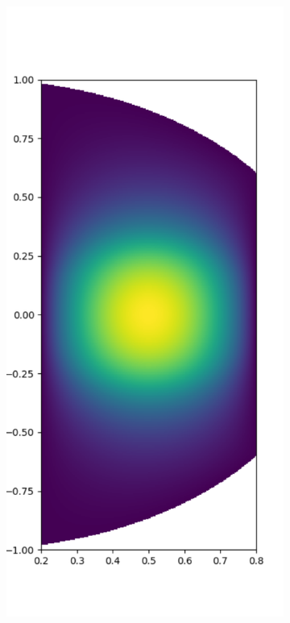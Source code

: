 \documentclass[11pt, oneside]{article}   	%
\begin{document}
\begin{figure}[t]
	\begin{subfigure}{0.3\textwidth}
	\includegraphics[scale=0.3]{solution-poisson-diskslice-alpha=0p2-beta=0p8}
	\centering

\end{subfigure}
\end{figure}
\end{document}
